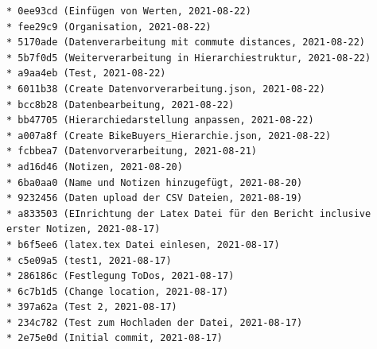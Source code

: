 \documentclass[usegeometry=true]{scrartcl}
\begin{document}
\begin{verbatim}
* 0ee93cd (Einfügen von Werten, 2021-08-22)
* fee29c9 (Organisation, 2021-08-22)
* 5170ade (Datenverarbeitung mit commute distances, 2021-08-22)
* 5b7f0d5 (Weiterverarbeitung in Hierarchiestruktur, 2021-08-22)
* a9aa4eb (Test, 2021-08-22)
* 6011b38 (Create Datenvorverarbeitung.json, 2021-08-22)
* bcc8b28 (Datenbearbeitung, 2021-08-22)
* bb47705 (Hierarchiedarstellung anpassen, 2021-08-22)
* a007a8f (Create BikeBuyers_Hierarchie.json, 2021-08-22)
* fcbbea7 (Datenvorverarbeitung, 2021-08-21)
* ad16d46 (Notizen, 2021-08-20)
* 6ba0aa0 (Name und Notizen hinzugefügt, 2021-08-20)
* 9232456 (Daten upload der CSV Dateien, 2021-08-19)
* a833503 (EInrichtung der Latex Datei für den Bericht inclusive erster Notizen, 2021-08-17)
* b6f5ee6 (latex.tex Datei einlesen, 2021-08-17)
* c5e09a5 (test1, 2021-08-17)
* 286186c (Festlegung ToDos, 2021-08-17)
* 6c7b1d5 (Change location, 2021-08-17)
* 397a62a (Test 2, 2021-08-17)
* 234c782 (Test zum Hochladen der Datei, 2021-08-17)
* 2e75e0d (Initial commit, 2021-08-17)


\end{verbatim}



\newpage

\end{document}
